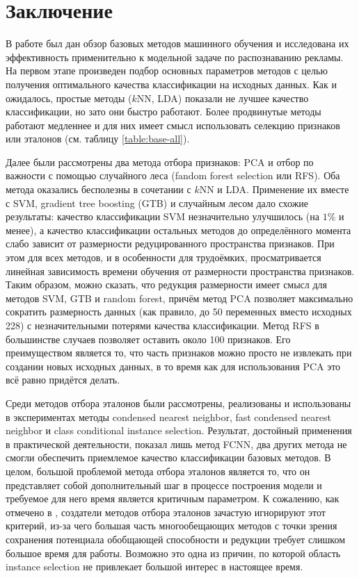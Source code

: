 \section{Заключение}
В работе был дан обзор базовых методов машинного обучения и исследована их эффективность применительно к модельной задаче по распознаванию рекламы. На первом этапе произведен подбор основных параметров методов с целью получения оптимального качества классификации на исходных данных. Как и ожидалось, простые методы (\(k\)NN, LDA) показали не лучшее качество классификации, но зато они быстро работают. Более продвинутые методы работают медленнее и для них имеет смысл использовать селекцию признаков или эталонов (см. таблицу \ref{table:base-all}). 
\par
Далее были рассмотрены два метода отбора признаков: PCA и отбор по важности с помощью случайного леса (fandom forest selection или RFS). Оба метода оказались бесполезны в сочетании с \(k\)NN и LDA. Применение их вместе с SVM, gradient tree boosting (GTB) и случайным лесом дало схожие результаты: качество классификации SVM незначительно улучшилось (на \(1\%\) и менее), а качество классификации остальных методов до определённого момента слабо зависит от размерности редуцированного пространства признаков. При этом для всех методов, и в особенности для трудоёмких, просматривается линейная зависимость времени обучения от размерности пространства признаков. Таким образом, можно сказать, что редукция размерности имеет смысл для методов SVM, GTB и random forest, причём метод PCA позволяет максимально сократить размерность данных (как правило, до 50 переменных вместо исходных 228) с незначительными потерями качества классификации. Метод RFS в большинстве случаев позволяет оставить около 100 признаков. Его преимуществом является то, что часть признаков можно просто не извлекать при создании новых исходных данных, в то время как для использования PCA это всё равно придётся делать.

Среди методов отбора эталонов были рассмотрены, реализованы и использованы в экспериментах методы condensed nearest neighbor, fast condensed nearest neighbor и class conditional instance selection. Результат, достойный применения в практической деятельности, показал лишь метод FCNN, два других метода не смогли обеспечить приемлемое качество классификации базовых методов. В целом, большой проблемой метода отбора эталонов является то, что он представляет собой дополнительный шаг в процессе построения модели и требуемое для него время является критичным параметром. К сожалению, как отмечено в \cite{angiulli}, создатели методов отбора эталонов зачастую игнорируют этот критерий, из-за чего большая часть многообещающих методов с точки зрения сохранения потенциала обобщающей способности и редукции требует слишком большое время для работы. Возможно это одна из причин, по которой область instance selection не привлекает большой интерес в настоящее время.

